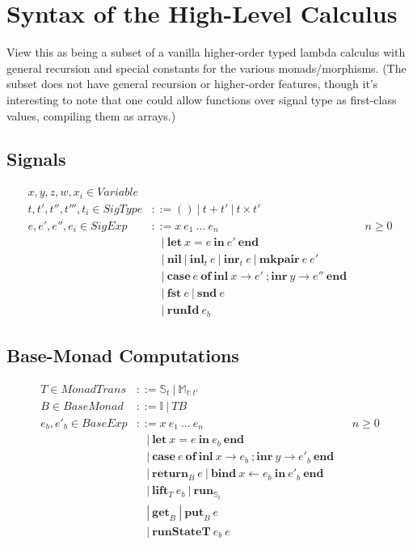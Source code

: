 \documentclass{article}[11pt]
\begin{document}
\section{Syntax of the High-Level Calculus}
View this as being a subset of a vanilla higher-order typed lambda calculus with general recursion and special constants for the various monads/morphisms. (The subset does not have general recursion or higher-order features, though it's interesting to note that one could allow functions over signal type as first-class values, compiling them as arrays.)
\subsection{Signals}
$$
\begin{aligned}
x,y,z,w,x_i \in \mathit{Variable}\\
t,t',t'',t''',t_i \in \mathit{SigType} &::= ()~ |~ t + t'~ |~ t \times t'\\
e,e',e'',e_i \in \mathit{SigExp}&::= x~ e_1~ \dots~ e_n&&n \ge 0\\
  &~~~~|~ \mathbf{let}~ x = e~ \mathbf{in}~ e'~ \mathbf{end}\\
  &~~~~|~ \mathbf{nil}~ |~ \mathbf{inl}_t~ e~ |~ \mathbf{inr}_t~ e~ |~ \mathbf{mkpair}~ e~ e'\\
  &~~~~|~ \mathbf{case}~ e~ \mathbf{of}~ \mathbf{inl}~ x \rightarrow e'~ ; \mathbf{inr}~ y \rightarrow e''~ \mathbf{end}\\
  &~~~~|~ \mathbf{fst}~ e~ |~ \mathbf{snd}~ e\\
  &~~~~|~ \mathbf{runId}~ e_b
\end{aligned}
$$

\subsection{Base-Monad Computations}
$$
\begin{aligned}
T \in \mathit{MonadTrans} &::= \mathbb{S}_t~ |~ \mathbb{M}_{t:t'}\\
B \in \mathit{BaseMonad} &::= \mathbb{I}~ |~ T B\\
e_b,e'_b \in \mathit{BaseExp} &::= x~ e_1~ \dots~ e_n&&n \ge 0\\
  &~~~~|~ \mathbf{let}~ x = e~ \mathbf{in}~ e_b~ \mathbf{end}\\
  &~~~~|~ \mathbf{case}~ e~ \mathbf{of}~ \mathbf{inl}~ x \rightarrow e_b~ ; \mathbf{inr}~ y \rightarrow e'_b~ \mathbf{end}\\
  &~~~~|~ \mathbf{return}_B~ e~ |~ \mathbf{bind}~ x \leftarrow{} e_b~ \mathbf{in}~ e'_b~ \mathbf{end}\\
  &~~~~|~ \mathbf{lift}_T~ e_b~ |~ \mathbf{run}_{\mathbb{S}_t}~ \\
  &~~~~|~ \mathbf{get}_B~ |~ \mathbf{put}_B~ e\\
  &~~~~|~ \mathbf{runStateT}~ e_b~ e~\\
\end{aligned}
$$
\end{document}
